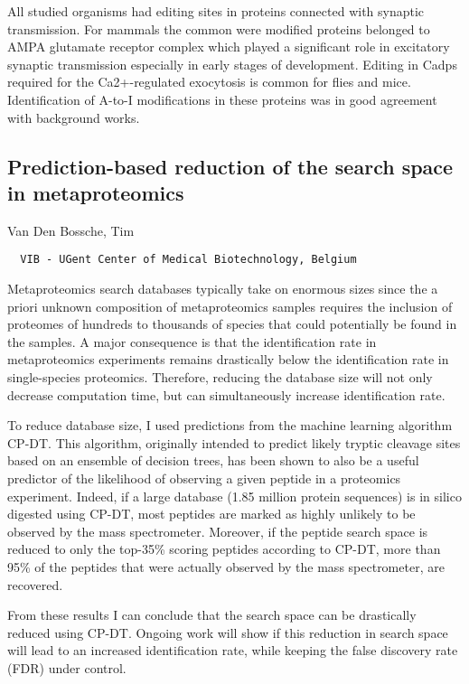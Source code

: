 {All studied organisms had editing sites in proteins connected with synaptic transmission. For mammals the common were modified proteins belonged to AMPA glutamate receptor complex which played a significant role in excitatory synaptic transmission especially in early stages of development. Editing in Cadps required for the Ca2+-regulated exocytosis is common for flies and mice. Identification of A-to-I modifications in these proteins was in good agreement with background works.


\subsection*{\color{eubicRed} Prediction-based reduction of the search space in metaproteomics}
{\color{eubicGray}Van Den Bossche, Tim}
{\color{eubicGray}\begin{verbatim}
  VIB - UGent Center of Medical Biotechnology, Belgium
\end{verbatim}}

Metaproteomics search databases typically take on enormous sizes since the a priori unknown composition of metaproteomics samples requires the inclusion of proteomes of hundreds to thousands of species that could potentially be found in the samples. A major consequence is that the identification rate in metaproteomics experiments remains drastically below the identification rate in single-species proteomics. Therefore, reducing the database size will not only decrease computation time, but can simultaneously increase identification rate.

To reduce database size, I used predictions from the machine learning algorithm CP-DT. This algorithm, originally intended to predict likely tryptic cleavage sites based on an ensemble of decision trees, has been shown to also be a useful predictor of the likelihood of observing a given peptide in a proteomics experiment. Indeed, if a large database (1.85 million protein sequences) is in silico digested using CP-DT, most peptides are marked as highly unlikely to be observed by the mass spectrometer. Moreover, if the peptide search space is reduced to only the top-35\% scoring peptides according to CP-DT, more than 95\% of the peptides that were actually observed by the mass spectrometer, are recovered.

From these results I can conclude that the search space can be drastically reduced using CP-DT. Ongoing work will show if this reduction in search space will lead to an increased identification rate, while keeping the false discovery rate (FDR) under control.


}
